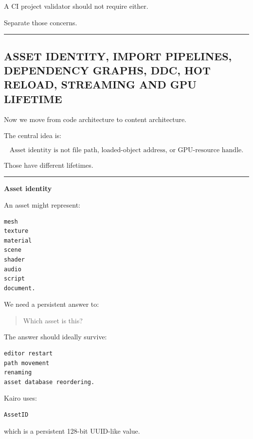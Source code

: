 A CI project validator should not require either.

Separate those concerns.

\begin{center}\rule{0.5\linewidth}{0.5pt}\end{center}

\subsection{ASSET IDENTITY, IMPORT PIPELINES, DEPENDENCY GRAPHS, DDC, HOT RELOAD, STREAMING AND GPU LIFETIME}\label{05-engine-i-ch010-asset-identity-import-pipelines-dependency-graphs-ddc-hot-reload-streaming-and-gpu-lifetime}

\hypertarget{05-engine-i-ch010-asset-identity-import-pipelines-dependency-graphs-ddc-hot-reload-streaming-and-gpu-lifetime}{}

Now we move from code architecture to content architecture.

The central idea is:

\[
\boxed{
\text{Asset identity is not file path,
loaded-object address,
or GPU-resource handle.}
}
\]

Those have different lifetimes.

\begin{center}\rule{0.5\linewidth}{0.5pt}\end{center}

\textbf{Asset identity}

An asset might represent:

\begin{verbatim}
mesh
texture
material
scene
shader
audio
script
document.
\end{verbatim}

We need a persistent answer to:

\begin{quote}
Which asset is this?
\end{quote}

The answer should ideally survive:

\begin{verbatim}
editor restart
path movement
renaming
asset database reordering.
\end{verbatim}

Kairo uses:

\begin{verbatim}
AssetID
\end{verbatim}

which is a persistent 128-bit UUID-like value.

